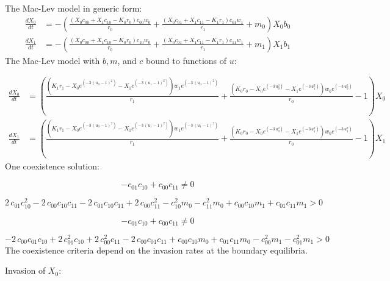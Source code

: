 \documentclass{article}
\begin{document}
The Mac-Lev model in generic form: 
\[\begin{align*}
\frac{dX_{0}}{dt} &= -{\left(\frac{{\left(X_{0} c_{00} + X_{1} c_{10} - K_{0} r_{0}\right)} c_{00} w_{0}}{r_{0}} + \frac{{\left(X_{0} c_{01} + X_{1} c_{11} - K_{1} r_{1}\right)} c_{01} w_{1}}{r_{1}} + m_{0}\right)} X_{0} b_{0}\\
\frac{dX_{1}}{dt} &= -{\left(\frac{{\left(X_{0} c_{00} + X_{1} c_{10} - K_{0} r_{0}\right)} c_{10} w_{0}}{r_{0}} + \frac{{\left(X_{0} c_{01} + X_{1} c_{11} - K_{1} r_{1}\right)} c_{11} w_{1}}{r_{1}} + m_{1}\right)} X_{1} b_{1}
\end{align*} \
\]
The Mac-Lev model with $b, m$, and $c$ bound to functions of $u$:

\[\begin{align*}
\frac{dX_{0}}{dt} &= {\left(\frac{{\left(K_{1} r_{1} - X_{0} e^{\left(-3 \, {\left(u_{0} - 1\right)}^{2}\right)} - X_{1} e^{\left(-3 \, {\left(u_{1} - 1\right)}^{2}\right)}\right)} w_{1} e^{\left(-3 \, {\left(u_{0} - 1\right)}^{2}\right)}}{r_{1}} + \frac{{\left(K_{0} r_{0} - X_{0} e^{\left(-3 \, u_{0}^{2}\right)} - X_{1} e^{\left(-3 \, u_{1}^{2}\right)}\right)} w_{0} e^{\left(-3 \, u_{0}^{2}\right)}}{r_{0}} - 1\right)} X_{0}\\
\frac{dX_{1}}{dt} &= {\left(\frac{{\left(K_{1} r_{1} - X_{0} e^{\left(-3 \, {\left(u_{0} - 1\right)}^{2}\right)} - X_{1} e^{\left(-3 \, {\left(u_{1} - 1\right)}^{2}\right)}\right)} w_{1} e^{\left(-3 \, {\left(u_{1} - 1\right)}^{2}\right)}}{r_{1}} + \frac{{\left(K_{0} r_{0} - X_{0} e^{\left(-3 \, u_{0}^{2}\right)} - X_{1} e^{\left(-3 \, u_{1}^{2}\right)}\right)} w_{0} e^{\left(-3 \, u_{1}^{2}\right)}}{r_{0}} - 1\right)} X_{1}
\end{align*} \
\]
One coexistence solution:

\[-c_{01} c_{10} + c_{00} c_{11} \neq 0 \
\]

\[2 \, c_{01} c_{10}^{2} - 2 \, c_{00} c_{10} c_{11} - 2 \, c_{01} c_{10} c_{11} + 2 \, c_{00} c_{11}^{2} - c_{10}^{2} m_{0} - c_{11}^{2} m_{0} + c_{00} c_{10} m_{1} + c_{01} c_{11} m_{1} > 0 \
\]

\[-c_{01} c_{10} + c_{00} c_{11} \neq 0 \
\]

\[-2 \, c_{00} c_{01} c_{10} + 2 \, c_{01}^{2} c_{10} + 2 \, c_{00}^{2} c_{11} - 2 \, c_{00} c_{01} c_{11} + c_{00} c_{10} m_{0} + c_{01} c_{11} m_{0} - c_{00}^{2} m_{1} - c_{01}^{2} m_{1} > 0 \
\]
The coexistence criteria depend on the invasion rates at the boundary equilibria.

Invasion of $X_{0}$:
\end{document}

